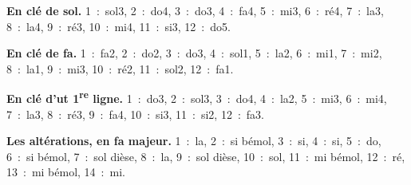 \textbf{En clé de sol.} 1~:~sol3, 2~:~do4, 3~:~do3, 4~:~fa4, 5~:~mi3, 6~:~ré4, 7~:~la3, 8~:~la4, 9~:~ré3, 10~:~mi4, 11~:~si3, 12~:~do5.

\textbf{En clé de fa.} 1~:~fa2, 2~:~do2, 3~:~do3, 4~:~sol1, 5~:~la2, 6~:~mi1, 7~:~mi2, 8~:~la1, 9~:~mi3, 10~:~ré2, 11~:~sol2, 12~:~fa1.

\textbf{En clé d'ut 1\textsuperscript{re} ligne.} 1~:~do3, 2~:~sol3, 3~:~do4, 4~:~la2, 5~:~mi3, 6~:~mi4, 7~:~la3, 8~:~ré3, 9~:~fa4, 10~:~si3, 11~:~si2, 12~:~fa3.

\textbf{Les altérations, en fa majeur.} 1~:~la, 2~:~si bémol, 3~:~si, 4~:~si, 5~:~do, 6~:~si bémol, 7~:~sol dièse, 8~:~la, 9~:~sol dièse, 10~:~sol, 11~:~mi bémol, 12~:~ré, 13~:~mi bémol, 14~:~mi.
